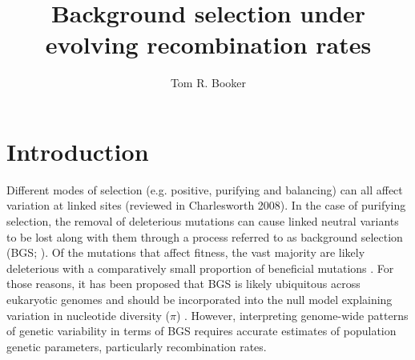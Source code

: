 \documentclass[11pt,twoside, onecolumn]{GSA_format}
\title{Background selection under evolving recombination rates}
\author[$\ast$]{Tom R. Booker}
\affil[$\ast$]{Department of Zoology, University of British Columbia}
\begin{document}
\maketitle

\marginmark

\firstpagefootnote


\vspace{-33pt}%

\section{Introduction}

Different modes of selection (e.g. positive, purifying and balancing) can all affect variation at linked sites (reviewed in Charlesworth 2008). In the case of purifying selection, the removal of deleterious mutations  can cause linked neutral variants to be lost along with them through a process referred to as background selection (BGS; \citealt{RN132}). Of the mutations that affect fitness, the vast majority are likely deleterious with a comparatively small proportion of beneficial mutations \citep{RN132}. For those reasons, it has been proposed that BGS is likely ubiquitous across eukaryotic genomes and should be incorporated into the null model explaining variation in nucleotide diversity ($\pi$) \citep{Comeron2017-jc, Johri2020}. However, interpreting genome-wide patterns of genetic variability in terms of BGS requires accurate estimates of population genetic parameters, particularly recombination rates.
 

\end{document}
